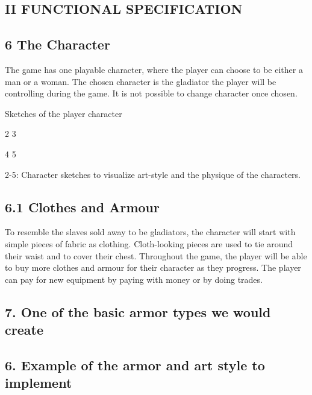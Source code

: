 \documentclass{article}
\begin{document}
\begin{titlepage}
\subsection{ II FUNCTIONAL SPECIFICATION }
\subsection{ 6 The Character }
The game has one playable character, where the player can choose to be either a man or a woman. The chosen character is the gladiator the player will be controlling during the game. It is not possible to change character once chosen. 

Sketches of the player character



2                    3


4                5            


2-5: Character sketches to visualize art-style and the physique of the characters.




\subsection{ 6.1 Clothes and Armour }
To resemble the slaves sold away to be gladiators, the character will start with simple pieces of fabric as clothing. Cloth-looking pieces are used to tie around their waist and to cover their chest. Throughout the game, the player will be able to buy more clothes and armour for their character as they progress. The player can pay for new equipment by paying with money or by doing trades.
 










\subsection{ 7. One of the basic armor types we would create }










\subsection{ 6. Example of the armor and art style to implement }





\end{titlepage}
\end{document}
